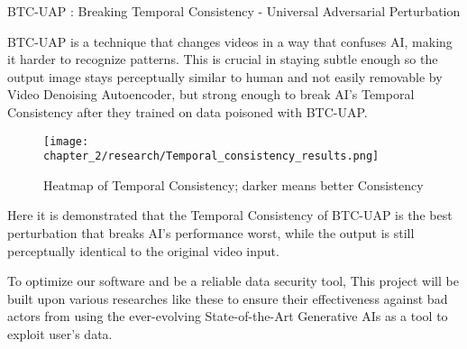 \begin{enumerate}
\begin{figure}[h]
    \end{figure}
    \par BTC-UAP : Breaking Temporal Consistency - Universal Adversarial Perturbation

    BTC-UAP is a technique that changes videos in a way that confuses AI, making it harder to recognize patterns. This is crucial in staying subtle enough so the output image stays perceptually similar to human and not easily removable by Video Denoising Autoencoder, but strong enough to break AI's Temporal Consistency after they trained on data poisoned with BTC-UAP.

    \begin{figure}[h]
        \centering
        \texttt{[image: chapter\_2/research/Temporal\_consistency\_results.png]}
        \caption{Heatmap of Temporal Consistency; darker means better Consistency}
    
    \end{figure}

    Here it is demonstrated that the Temporal Consistency of BTC-UAP is the best perturbation that breaks AI’s performance worst, while the output is still perceptually identical to the original video input.
    
\end{enumerate}


To optimize our software and be a reliable data security tool, This project will be built upon various researches like these to ensure their effectiveness against bad actors from using the ever-evolving State-of-the-Art Generative AIs as a tool to exploit user's data.
